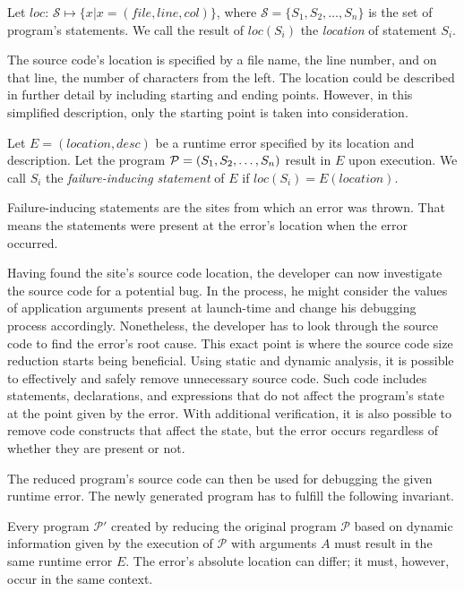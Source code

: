 \begin{defn}[Location]\label{def04:1}
  Let $loc$: $\mathcal{S} \mapsto \{x | x = (file, line, col)\}$, 
  where $\mathcal{S} = \{S_1, S_2, \ldots, S_n\}$ 
  is the set of program's statements.
  We call the result of $loc(S_i)$ the \emph{location} of statement $S_i$.
\end{defn}

The source code's location is specified by a file name, the line number, and 
on that line, the number of characters from the left.
The location could be described in further detail by including starting and 
ending points.
However, in this simplified description, only the starting point is taken 
into consideration.

\begin{defn}\label{def04:2}
  Let $E = (location, desc)$ be a runtime error specified by its location 
  and description. Let the program $\mathcal{P} = (S_1, S_2, \ldots,\-S_n)$
  result in $E$ upon execution.
  We call $S_i$ the \emph{failure-inducing statement} of 
  $E$ if $loc(S_i) = E(location)$.
\end{defn}

Failure-inducing statements are the sites from which an error was thrown.
That means the statements were present at the error's location when the error 
occurred.

Having found the site's source code location, the developer can now 
investigate the source code for a potential bug.
In the process, he might consider the values of application arguments 
present at launch-time and change his debugging process accordingly.
Nonetheless, the developer has to look through the source code to find 
the error's root cause.
This exact point is where the source code size reduction starts being 
beneficial.
Using static and dynamic analysis, it is possible to effectively and 
safely remove unnecessary source code.
Such code includes statements, declarations, and expressions that do not 
affect the program's state at the point given by the error.
With additional verification, it is also possible to remove code constructs 
that affect the state, but the error occurs regardless of whether they 
are present or not.

The reduced program's source code can then be used for debugging the given
runtime error.
The newly generated program has to fulfill the following invariant.

\begin{invar}\label{invar04:1}
  Every program $\mathcal{P'}$ created by reducing the original program 
  $\mathcal{P}$ based on dynamic information given by the execution of
  $\mathcal{P}$ with arguments $A$ must result in the same runtime error $E$.
  The error's absolute location can differ; it must, however, occur in the 
  same context.
\end{invar}

